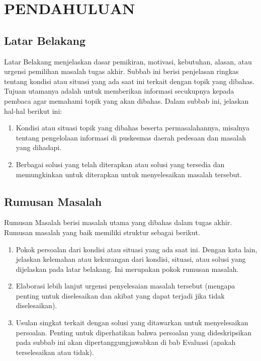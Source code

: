 \chapter{PENDAHULUAN}
\label{chap:pendahuluan}
\section{Latar Belakang}
Latar Belakang menjelaskan dasar pemikiran, motivasi, kebutuhan, alasan, atau urgensi pemilihan masalah tugas akhir. Subbab ini berisi penjelasan ringkas tentang kondisi atau situasi yang ada saat ini terkait dengan topik yang dibahas. Tujuan utamanya adalah untuk memberikan informasi secukupnya kepada pembaca agar memahami topik yang akan dibahas. Dalam subbab ini, jelaskan hal-hal berikut ini:
\begin{enumerate}
\item	Kondisi atau situasi topik yang dibahas beserta permasalahannya, misalnya tentang pengelolaan informasi di puskesmas daerah pedesaan dan masalah yang dihadapi.
\item	Berbagai solusi yang telah diterapkan atau solusi yang tersedia dan memungkinkan untuk diterapkan untuk menyelesaikan masalah tersebut.
\end{enumerate}

\section{Rumusan Masalah}
Rumusan Masalah berisi masalah utama yang dibahas dalam tugas akhir. Rumusan masalah yang baik memiliki struktur sebagai berikut.
\begin{enumerate}
\item	Pokok persoalan dari kondisi atau situasi yang ada saat ini. Dengan kata lain, jelaskan kelemahan atau kekurangan dari kondisi, situasi, atau solusi yang dijelaskan pada latar belakang. Ini merupakan pokok rumusan masalah.
\item	Elaborasi lebih lanjut urgensi penyelesaian masalah tersebut (mengapa penting untuk diselesaikan dan akibat yang dapat terjadi jika tidak diselesaikan).
\item	Usulan singkat terkait dengan solusi yang ditawarkan untuk menyelesaikan persoalan.
Penting untuk diperhatikan bahwa persoalan yang dideskripsikan pada subbab ini akan dipertanggungjawabkan di bab Evaluasi (apakah terselesaikan atau tidak).
\end{enumerate}


